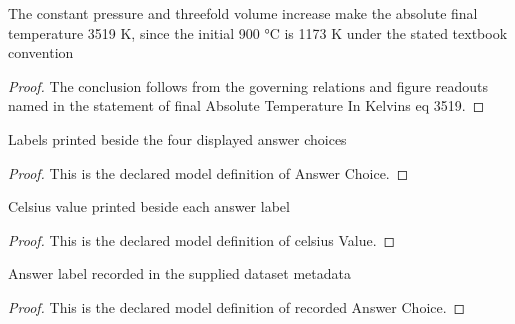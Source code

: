 \begin{lemma}
  \label{lem:physics:phyx-mini-0362:phyxminiproblems-problemphyxmini0362-finalabsolutetemperatureinkelvins-eq-3519}
  The constant pressure and threefold volume increase make the absolute final temperature 3519 K, since the initial 900 °C is 1173 K under the stated textbook convention
\end{lemma}
\begin{proof}
  The conclusion follows from the governing relations and figure readouts named in the statement of final Absolute Temperature In Kelvins eq 3519.
\end{proof}
\begin{definition}
  \label{def:physics:phyx-mini-0362:phyxminiproblems-problemphyxmini0362-answerchoice}
  Labels printed beside the four displayed answer choices
\end{definition}
\begin{proof}
  This is the declared model definition of Answer Choice.
\end{proof}
\begin{definition}
  \label{def:physics:phyx-mini-0362:phyxminiproblems-problemphyxmini0362-answerchoice-celsiusvalue}
  Celsius value printed beside each answer label
\end{definition}
\begin{proof}
  This is the declared model definition of celsius Value.
\end{proof}
\begin{definition}
  \label{def:physics:phyx-mini-0362:phyxminiproblems-problemphyxmini0362-recordedanswerchoice}
  Answer label recorded in the supplied dataset metadata
\end{definition}
\begin{proof}
  This is the declared model definition of recorded Answer Choice.
\end{proof}
